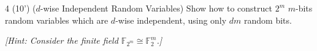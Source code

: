   \begin{question}{4 (10') ($d$-wise Independent Random Variables)}
    Show how to construct $2^m$ $m$-bits random variables which are $d$-wise independent, using only $dm$ random bits.
    	
    \textit{[Hint: Consider the finite field $\mathbb F_{2^m} \cong \mathbb F_2^m$.]}
    \end{question}
